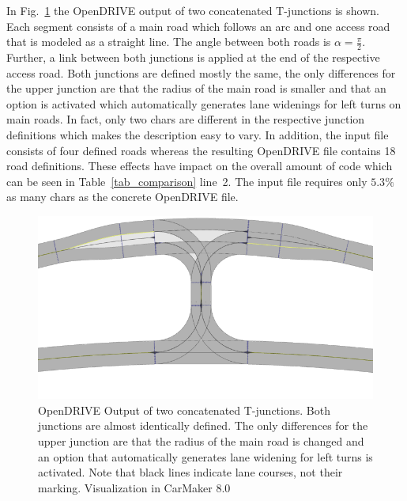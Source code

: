 \documentclass[a4paper, 10pt, conference]{ieeeconf}      %
\begin{document}
In Fig.~\ref{fig_res3_2} the OpenDRIVE output of two concatenated T-junctions is shown. Each segment consists of a main road which follows an arc and one access road that is modeled as a straight line. The angle between both roads is $\alpha=\frac{\pi}{2}$. Further, a link between both junctions is applied at the end of the respective access road. Both junctions are defined mostly the same, the only differences for the upper junction are that the radius of the main road is smaller and that an option is activated which automatically generates lane widenings for left turns on main roads. In fact, only two chars are different in the respective junction definitions which makes the description easy to vary. In addition, the input file consists of four defined roads whereas the resulting OpenDRIVE file contains 18 road definitions. These effects have impact on the overall amount of code which can be seen in Table~\ref{tab_comparison} line~2. The input file requires only $5.3\%$ as many chars as the concrete OpenDRIVE file.

\begin{figure}
	\includegraphics[width=\columnwidth]{fig/res3_2.png}
	\caption{OpenDRIVE Output of two concatenated T-junctions. Both junctions are almost identically defined. The only differences for the upper junction are that the radius of the main road is changed and an option that automatically generates lane widening for left turns is activated. Note that black lines indicate lane courses, not their marking. Visualization in CarMaker 8.0}
	\label{fig_res3_2}
\end{figure}
\end{document}
